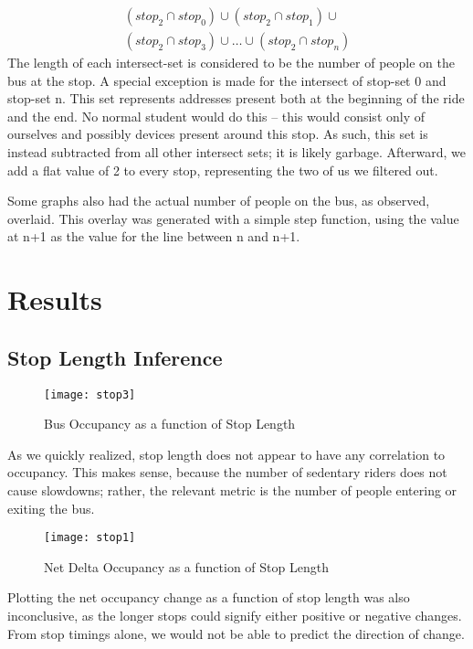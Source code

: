 \documentclass[12pt,journal,compsoc]{IEEEtran}
\begin{document}
\begin{itemize}
\begin{multline*}
      \left(stop_2 \cap stop_0\right) \cup \left(stop_2 \cap stop_1\right) \cup \\
      \left(stop_2 \cap stop_3\right) \cup \dots \cup \left(stop_2 \cap stop_n\right)
      \end{multline*}
      The length of each intersect-set is considered to be the number of people on the bus at the stop.
      A special exception is made for the intersect of stop-set 0 and stop-set n.
      This set represents addresses present both at the beginning of the ride and the end.
      No normal student would do this -- this would consist only of ourselves and possibly devices present around this stop.
      As such, this set is instead subtracted from all other intersect sets; it is likely garbage.
      Afterward, we add a flat value of 2 to every stop, representing the two of us we filtered out.
    \end{itemize}
    Some graphs also had the actual number of people on the bus, as observed, overlaid.
    This overlay was generated with a simple step function, using the value at n+1 as the value for the line between n and n+1.

\pagebreak

\section{Results}

\subsection*{Stop Length Inference}
	\begin{figure}[!t]
      \texttt{[image: stop3]}
      \caption{Bus Occupancy as a function of Stop Length}
	\end{figure}
	As we quickly realized, stop length does not appear to have any correlation to occupancy.
	This makes sense, because the number of sedentary riders does not cause slowdowns; rather, the relevant metric is the number of people entering or exiting the bus.

	\begin{figure}[!t]
	  \texttt{[image: stop1]}
      \caption{Net Delta Occupancy as a function of Stop Length}
	\end{figure}

	Plotting the net occupancy change as a function of stop length was also inconclusive, as the longer stops could signify either positive or negative changes.
	From stop timings alone, we would not be able to predict the direction of change.
\end{document}
